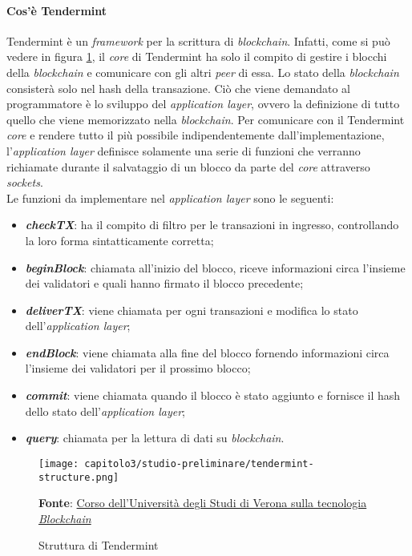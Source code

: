 \paragraph{Cos'è Tendermint}
Tendermint è un \textit{framework} per la scrittura di \textit{blockchain}. Infatti, come si può vedere in figura \ref{fig:tendermint-structure}, il \textit{core} di Tendermint ha solo il compito di gestire i blocchi della \textit{blockchain} e comunicare con gli altri \textit{peer} di essa. Lo stato della \textit{blockchain} consisterà solo nel hash della transazione. Ciò che viene demandato al programmatore è lo sviluppo del \textit{application layer}, ovvero la definizione di tutto quello che viene memorizzato nella \textit{blockchain}. Per comunicare con il Tendermint \textit{core} e rendere tutto il più possibile indipendentemente dall'implementazione, l'\textit{application layer} definisce solamente una serie di funzioni che verranno richiamate durante il salvataggio di un blocco da parte del \textit{core} attraverso \textit{sockets}. \\

\noindent Le funzioni da implementare nel \textit{application layer} sono le seguenti:
\begin{itemize}
  \item \textbf{\textit{checkTX}}: ha il compito di filtro per le transazioni in ingresso, controllando la loro forma sintatticamente corretta;
  \item \textbf{\textit{beginBlock}}: chiamata all'inizio del blocco, riceve informazioni circa l'insieme dei validatori e quali hanno firmato il blocco precedente;
  \item \textbf{\textit{deliverTX}}: viene chiamata per ogni transazioni e modifica lo stato dell'\textit{application layer};
  \item \textbf{\textit{endBlock}}: viene chiamata alla fine del blocco fornendo informazioni circa l'insieme dei validatori per il prossimo blocco;
  \item \textbf{\textit{commit}}: viene chiamata quando il blocco è stato aggiunto e fornisce il hash dello stato dell'\textit{application layer};
  \item \textbf{\textit{query}}: chiamata per la lettura di dati su \textit{blockchain}.
\end{itemize}

\begin{figure}[h!]
  \centering
  \texttt{[image: capitolo3/studio-preliminare/tendermint-structure.png]}
  \caption{Struttura di Tendermint}
  \textbf{Fonte}: \href{https://github.com/spoto/blockchain-course}{Corso dell'Università degli Studi di Verona sulla tecnologia \textit{Blockchain}} 
  \label{fig:tendermint-structure}
\end{figure}

